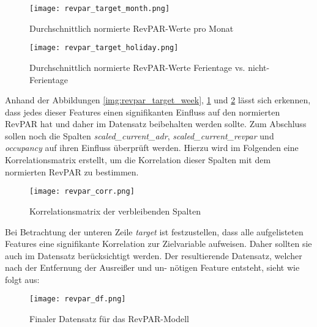\begin{figure}[h]
    \centering
    \texttt{[image: revpar\_target\_month.png]}
    \caption[Durchschnittlich normierte RevPAR-Werte pro Monat]{Durchschnittlich normierte RevPAR-Werte pro Monat}
    \label{img:revpar_target_month}
\end{figure}

\begin{figure}[h]
    \centering
    \texttt{[image: revpar\_target\_holiday.png]}
    \caption[Durchschnittlich normierte RevPAR-Werte Ferientage vs. nicht-Ferientage]{Durchschnittlich normierte RevPAR-Werte Ferientage vs. nicht-Ferientage}
    \label{img:revpar_target_holiday}
\end{figure}

Anhand der Abbildungen \ref{img:revpar_target_week}, \ref{img:revpar_target_month} und \ref{img:revpar_target_holiday} lässt sich erkennen, dass jedes dieser Features einen signifikanten Einfluss auf den normierten RevPAR hat und daher im Datensatz beibehalten werden sollte.
\newline 
\newline
Zum Abschluss sollen noch die Spalten \emph{scaled\_current\_adr}, \emph{scaled\_current\_revpar} und \emph{occupancy} auf ihren Einfluss überprüft werden. Hierzu wird im Folgenden eine Korrelationsmatrix erstellt, um die Korrelation dieser Spalten mit dem normierten RevPAR zu bestimmen.
\newpage
\begin{figure}[h]
    \centering
    \texttt{[image: revpar\_corr.png]}
    \caption[Korrelationsmatrix der verbleibenden Spalten]{Korrelationsmatrix der verbleibenden Spalten}
    \label{img:revpar_corr}
\end{figure}

Bei Betrachtung der unteren Zeile \emph{target} ist festzustellen, dass alle aufgelisteten Features eine signifikante Korrelation zur Zielvariable aufweisen. Daher sollten sie auch im Datensatz berücksichtigt werden.
\newline 
\newline 
Der resultierende Datensatz, welcher nach der Entfernung der Ausreißer und un- nötigen Feature entsteht, sieht wie folgt aus:

\begin{figure}[h]
    \centering
    \texttt{[image: revpar\_df.png]}
    \caption[Finaler Datensatz für das RevPAR-Modell]{Finaler Datensatz für das RevPAR-Modell}
    \label{img:revpar_df}
\end{figure}
